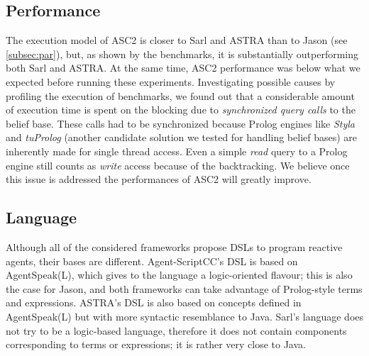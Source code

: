 \subsection{Performance}
The execution model of ASC2 is closer to Sarl and ASTRA than to Jason (see \ref{subsec:par}), but, as shown by the benchmarks, it is substantially outperforming both Sarl and ASTRA. At the same time, ASC2 performance was below what we expected before running these experiments. Investigating possible causes by profiling the execution of benchmarks, we found out that a considerable amount of execution time is spent on the blocking due to \textit{synchronized query calls} to the belief base. These calls had to be synchronized because Prolog engines like \textit{Styla} and \textit{tuProlog} \cite{tuprolog} (another candidate solution we tested for handling belief bases) are inherently made for single thread access. Even a simple \textit{read} query to a Prolog engine still counts as \textit{write} access because of the backtracking.
We believe once this issue is addressed the performances of ASC2 will greatly improve.


\subsection{Language}

Although all of the considered frameworks propose DSLs to program reactive agents, their bases are different. %
Agent-ScriptCC's DSL is based on AgentSpeak(L), which gives to the language a logic-oriented flavour; this is also the case for Jason, and both frameworks can take advantage of Prolog-style terms and expressions. ASTRA's DSL is also based on concepts defined in AgentSpeak(L) but with more syntactic resemblance to Java. Sarl's language does not try to be a logic-based language, therefore it does not contain components corresponding to terms or expressions; it is rather very close to Java.


